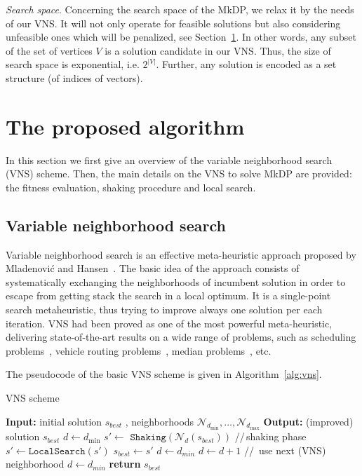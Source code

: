 \documentclass[dvipsnames,format=sigconf,anonymous=true,review=true]{acmart}
\begin{document}
\emph{Search space}.    Concerning the search space of the MkDP, we relax it by the needs of our VNS. It will not only operate for feasible solutions but also considering unfeasible ones which will be penalized, see Section~\ref{sec:vns}.  In other words, any subset of the set of vertices $V$ is a solution candidate in our VNS. Thus, the size of search space is exponential, i.e. $2^{|V|}$.  Further, any solution is encoded as a set structure (of indices of vectors). 
   
   
\section{The proposed algorithm}\label{sec:vns}

In this section we first give an overview of the variable neighborhood search (VNS) scheme. Then, the main details on the VNS to solve MkDP are provided: the fitness evaluation, shaking procedure and local search.
 
  \subsection{Variable neighborhood search}
 Variable neighborhood search is an effective meta-heuristic approach proposed by Mladenović and Hansen~\cite{mladenovic1997variable}. The basic idea of the approach consists of systematically exchanging the neighborhoods of incumbent solution in order to escape from getting stack the search in a  local optimum. It is a single-point search metaheuristic, thus trying to improve always one solution per each iteration. VNS had been proved as one of the most powerful meta-heuristic, delivering state-of-the-art results on a wide range of problems, such as scheduling problems~\cite{fleszar2004solving}, vehicle routing problems~\cite{rezgui2019application}, median problems~\cite{herran2019variable}, etc.  
  
  The pseudocode of the basic VNS scheme is given in Algorithm~\ref{alg:vns}.
  
     \begin{algorithm}[!t] 
  	\caption{VNS scheme}\label{alg:vns}
  	\begin{algorithmic}[1]
  		\STATE \textbf{Input:} initial solution $s_{best}$ , neighborhoods  $\mathcal{N}_{d_{\min}},\ldots, \mathcal{N}_{d_{\max}}$ 
  		\STATE \textbf{Output:} (improved) solution $s_{best}$
  		\STATE $d \gets  d_{\min}$
  		\STATE  $s' \gets$  $\texttt{Shaking}(\mathcal{N}_d(s_{best}))$ \hspace{0.3cm}//\,shaking phase
  		\STATE $s' \gets  \texttt{LocalSearch}(s {'})$
  		\STATE $s _{best}\gets s'$
  		\STATE $d \gets d_{min}$
  		\ELSE 
  		\STATE $d \gets d+1$ \hspace{0.3cm}//\, use next (VNS) neighborhood
  		\STATE $d\gets d_{min}$
  		\ENDIF
  		\ENDIF
  		\ENDWHILE
  		\STATE \textbf{return} $s_{best}$
  	\end{algorithmic}
  \end{algorithm}
\end{document}
